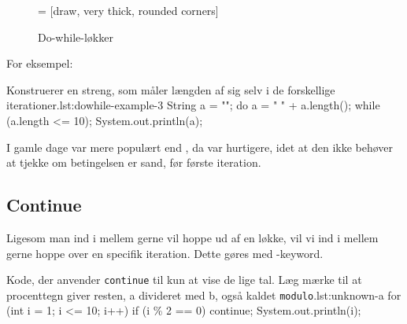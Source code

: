         \begin{figure}
        \center
         = [draw, very thick, rounded corners]
        \caption{Do-while-løkker}
        \label{fig:do-while-loop-illustrated}
        \end{figure}

		For eksempel:

		\begin{JavaCode}{Konstruerer en streng, som måler længden af sig selv i de forskellige iterationer.}{lst:dowhile-example-3}
			String a = "";
			do {
				a = " " + a.length();
			} while (a.length <= 10);
			System.out.println(a);
		\end{JavaCode}

        I gamle dage var  mere populært end
        , da  var
        hurtigere, idet at den ikke behøver at tjekke om betingelsen er
        sand, før første iteration.

	\subsection{Continue}

        Ligesom man ind i mellem gerne vil hoppe ud af en løkke, vil
        vi ind i mellem gerne hoppe over en specifik iteration. Dette
        gøres med -keyword.

        \begin{JavaCode}{Kode, der anvender \texttt{continue} til kun at vise de lige tal. Læg mærke til at procenttegn giver resten, a divideret med b, også kaldet \texttt{modulo}.}{lst:unknown-a}
			for (int i = 1; i <= 10; i++) {
				if (i \% 2 == 0) continue;
				System.out.println(i);
			}
		\end{JavaCode}

